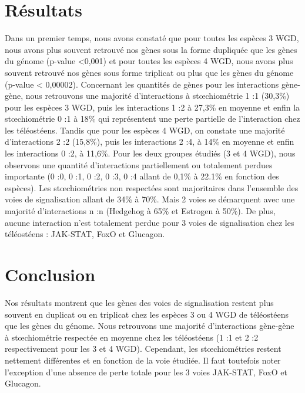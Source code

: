 \section{Résultats}
\par Dans un premier temps, nous avons constaté que pour toutes les espèces 3 WGD, nous avons plus souvent retrouvé nos gènes sous la forme dupliquée que les gènes du génome (p-value <0,001) et pour toutes les espèces 4 WGD, nous avons plus souvent retrouvé nos gènes sous forme triplicat ou plus que les gènes du génome (p-value < 0,00002). Concernant les quantités de gènes pour les interactions gène-gène, nous retrouvons une majorité d’interactions à stœchiométrie 1 :1 (30,3\%) pour les espèces 3 WGD, puis les interactions 1 :2 à 27,3\% en moyenne et enfin la stœchiométrie 0 :1 à 18\% qui représentent une perte partielle de l’interaction chez les téléostéens. Tandis que pour les espèces 4 WGD, on constate une majorité d’interactions 2 :2 (15,8\%), puis les interactions 2 :4, à 14\% en moyenne et enfin les interactions 0 :2, à 11,6\%. Pour les deux groupes étudiés (3 et 4 WGD), nous observons une quantité d’interactions partiellement ou totalement perdues importante (0 :0, 0 :1, 0 :2, 0 :3, 0 :4 allant de 0,1\% à 22.1\% en fonction des espèces). Les stœchiométries non respectées sont majoritaires dans l’ensemble des voies de signalisation allant de 34\% à 70\%. Mais 2 voies se démarquent avec une majorité d’interactions n :n (Hedgehog à 65\% et Estrogen à 50\%). De plus, aucune interaction n’est totalement perdue pour 3 voies de signalisation chez les téléostéens : JAK-STAT, FoxO et Glucagon. 

\section{Conclusion}
\par Nos résultats montrent que les gènes des voies de signalisation restent plus souvent en duplicat ou en triplicat chez les espèces 3 ou 4 WGD de téléostéens que les gènes du génome. Nous retrouvons une majorité d’interactions gène-gène à stœchiométrie respectée en moyenne chez les téléostéens (1 :1 et 2 :2 respectivement pour les 3 et 4 WGD). Cependant, les stœchiométries restent nettement différentes et en fonction de la voie étudiée. Il faut toutefois noter l’exception d’une absence de perte totale pour les 3 voies JAK-STAT, FoxO et Glucagon. 

